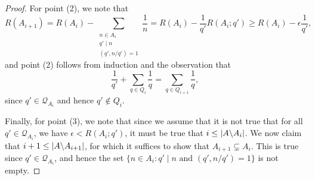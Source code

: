 \begin{proof}
For point (2), we note that 
\[R(A_{i+1})= R(A_i)-\sum_{\substack{n\in A_i\\ q'\mid n\\ (q',n/q')=1}}\frac{1}{n} = R(A_i)-\frac{1}{q'}R(A_i;q')\geq R(A_i)-\epsilon \frac{1}{q'},\]
and point (2) follows from induction and the observation that
\[\frac{1}{q'}+\sum_{q\in Q_i}\frac{1}{q}=\sum_{q\in Q_{i+1}}\frac{1}{q},\]
since $q'\in\mathcal{Q}_{A_i}$ and hence $q'\not\in Q_{i}$. 

Finally, for point (3), we note that since we assume that it is not true that for all $q'\in\mathcal{Q}_{A_i}$, we have $\epsilon <R(A_i;q')$, it must be true that $i\leq \left\lvert A\backslash A_{i}\right\rvert$. We now claim that $i+1\leq \left\lvert A\backslash A_{i+1}\right\rvert$, for which it suffices to show that $A_{i+1}\subsetneq A_i$. This is true since $q'\in\mathcal{Q}_{A_i}$, and hence the set $\{ n\in A_i : q'\mid n \textrm{ and }(q',n/q')=1\}$ is not empty. 
\end{proof}

